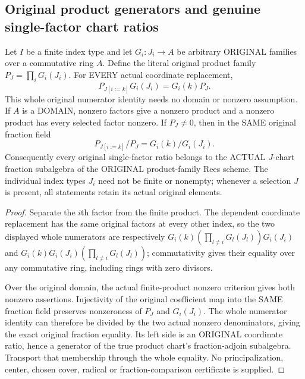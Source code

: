 \subsection{Original product generators and genuine single-factor chart ratios}

\begin{lemma}
\label{algebra:actual-product-rees-chart-ratios}
\leanok
{}
Let $I$ be a finite index type and let $G_i:J_i\to A$ be arbitrary ORIGINAL
families over a commutative ring $A$.  Define the literal original product
family $P_J=\prod_iG_i(J_i)$.  For EVERY actual coordinate replacement,
\[
 P_{J[i:=k]}G_i(J_i)=G_i(k)P_J.
\]
This whole original numerator identity needs no domain or nonzero assumption.
If $A$ is a DOMAIN, nonzero factors give a nonzero product and a nonzero
product has every selected factor nonzero.  If $P_J\ne0$, then in the SAME
original fraction field
\[
 P_{J[i:=k]}/P_J=G_i(k)/G_i(J_i).
\]
Consequently every original single-factor ratio belongs to the ACTUAL
$J$-chart fraction subalgebra of the ORIGINAL product-family Rees scheme.
The individual index types $J_i$ need not be finite or nonempty; whenever a
selection $J$ is present, all statements retain its actual original elements.
\end{lemma}
\begin{proof}
Separate the $i$th factor from the finite product.  The dependent coordinate
replacement has the same original factors at every other index, so the two
displayed whole numerators are respectively
$G_i(k)(\prod_{l\ne i}G_l(J_l))G_i(J_i)$ and
$G_i(k)G_i(J_i)(\prod_{l\ne i}G_l(J_l))$; commutativity gives their equality
over any commutative ring, including rings with zero divisors.

Over the original domain, the actual finite-product nonzero criterion gives
both nonzero assertions.  Injectivity of the original coefficient map into
the SAME fraction field preserves nonzeroness of $P_J$ and $G_i(J_i)$.
The whole numerator identity can therefore be divided by the two actual
nonzero denominators, giving the exact original fraction equality.  Its left
side is an ORIGINAL coordinate ratio, hence a generator of the true product
chart's fraction-adjoin subalgebra.  Transport that membership through the
whole equality.  No principalization, center, chosen cover, radical or
fraction-comparison certificate is supplied.
\end{proof}
